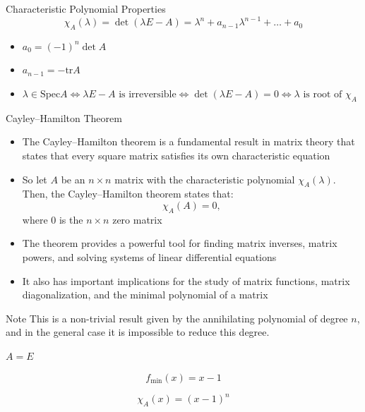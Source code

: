 \documentclass[fullscreen=true, bookmarks=true, hyperref={pdfencoding=unicode}]{beamer}
\begin{document}
\begin{frame}{Characteristic Polynomial Properties}
  \[
    \chi_A(\lambda) = \det(\lambda E - A) = 
    \lambda^n + a_{n-1}\lambda^{n-1} + \hdots + a_0
  \]
  \begin{itemize}
    \item $a_0 = (-1)^n \det A$
    \item $a_{n-1} = -\mathrm{tr} A$
    \item $\lambda \in \mathrm{Spec}A \iff \lambda E - A \text{ is irreversible}
    \iff \det(\lambda E - A) = 0 \iff \lambda \text{ is root of } \chi_A$
  \end{itemize}
\end{frame}


\begin{frame}{Cayley--Hamilton Theorem}
  \begin{itemize}
    \item The Cayley--Hamilton theorem is a fundamental result 
    in matrix theory that states that every square matrix satisfies 
    its own characteristic equation
    \pause
    \item So let $A$ be an $n \times n$ matrix 
    with the characteristic polynomial $\chi_A(\lambda)$. 
    Then, the Cayley--Hamilton theorem states that:
      \[
        \chi_A(A) = 0,
      \]
      where 0 is the $n \times n$ zero matrix
    \pause
    \item The theorem provides a powerful tool for finding 
    matrix inverses, matrix powers, and solving systems of 
    linear differential equations
    \item It also has important implications for the study 
    of matrix functions, matrix diagonalization, and 
    the minimal polynomial of a matrix
  \end{itemize}

  \pause
  \begin{block}{Note}
    \small This is a non-trivial result given by the annihilating polynomial 
    of degree $n$, and in the general case it is impossible 
    to reduce this degree.
  \end{block}
\end{frame}


\begin{frame}
  \begin{example}
    $A=E$

    $$f_{\min} (x) = x - 1$$

    $$ \chi_A(x) = (x-1)^n$$
  \end{example}
\end{frame}
\end{document}
